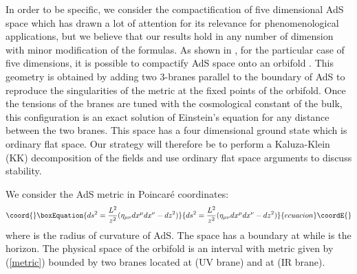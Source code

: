 \documentclass[a4paper,12pt,dvips]{article}
\begin{document}
In order to be specific, we consider the compactification of five
dimensional AdS space which has drawn a lot of attention for its
relevance for phenomenological applications, but we believe that
our results hold in any number of dimension with minor
modification of the formulas.
 As shown in \cite{RS1}, for the
particular case of five dimensions, it is possible to compactify
AdS space onto an orbifold \coordHE{}. This geometry is
obtained by adding two 3-branes parallel to the boundary of AdS to
reproduce the singularities of the metric at the fixed points of
the orbifold. Once the tensions of the branes are tuned with the
cosmological constant of the bulk, this configuration is an exact
solution of Einstein's equation for any distance between the two
branes. This space has a four dimensional ground state which is
ordinary flat space. Our strategy will therefore be to perform a
Kaluza-Klein  (KK) decomposition of the fields and use ordinary
flat space arguments to discuss stability.


We consider the AdS metric in Poincar\'e coordinates:
\begin{equation}\coord{}\boxEquation{
ds^2=\frac {L^2} {z^2} (\eta_{\mu \nu}dx^\mu dx^\nu-dz^2)
\label{metric}
}{
ds^2=\frac {L^2} {z^2} (\eta_{\mu \nu}dx^\mu dx^\nu-dz^2)
}{ecuacion}\coordE{}\end{equation}
where \coordHE{} is the radius of curvature of AdS. The space has a
boundary at \coordHE{} while \coordHE{} is the horizon. The physical
space of the orbifold is an interval with metric given by
(\ref{metric}) bounded by two branes located at \coordHE{} (UV brane)
and at \coordHE{} (IR brane).
\end{document}
